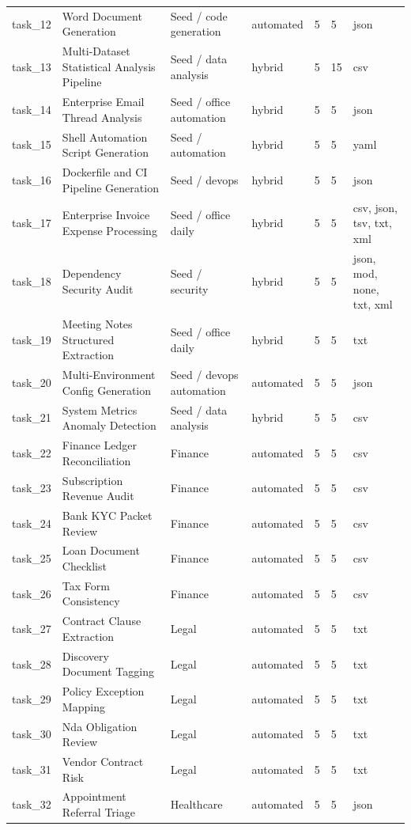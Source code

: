 \documentclass[11pt]{article}
\begin{document}
\begin{longtable}{L{0.09\textwidth}L{0.30\textwidth}L{0.25\textwidth}L{0.10\textwidth}L{0.07\textwidth}L{0.07\textwidth}L{0.08\textwidth}}
task\_12 & Word Document Generation & Seed / code generation & automated & 5 & 5 & json \\
task\_13 & Multi-Dataset Statistical Analysis Pipeline & Seed / data analysis & hybrid & 5 & 15 & csv \\
task\_14 & Enterprise Email Thread Analysis & Seed / office automation & hybrid & 5 & 5 & json \\
task\_15 & Shell Automation Script Generation & Seed / automation & hybrid & 5 & 5 & yaml \\
task\_16 & Dockerfile and CI Pipeline Generation & Seed / devops & hybrid & 5 & 5 & json \\
task\_17 & Enterprise Invoice Expense Processing & Seed / office daily & hybrid & 5 & 5 & csv, json, tsv, txt, xml \\
task\_18 & Dependency Security Audit & Seed / security & hybrid & 5 & 5 & json, mod, none, txt, xml \\
task\_19 & Meeting Notes Structured Extraction & Seed / office daily & hybrid & 5 & 5 & txt \\
task\_20 & Multi-Environment Config Generation & Seed / devops automation & automated & 5 & 5 & json \\
task\_21 & System Metrics Anomaly Detection & Seed / data analysis & hybrid & 5 & 5 & csv \\
task\_22 & Finance Ledger Reconciliation & Finance & automated & 5 & 5 & csv \\
task\_23 & Subscription Revenue Audit & Finance & automated & 5 & 5 & csv \\
task\_24 & Bank KYC Packet Review & Finance & automated & 5 & 5 & csv \\
task\_25 & Loan Document Checklist & Finance & automated & 5 & 5 & csv \\
task\_26 & Tax Form Consistency & Finance & automated & 5 & 5 & csv \\
task\_27 & Contract Clause Extraction & Legal & automated & 5 & 5 & txt \\
task\_28 & Discovery Document Tagging & Legal & automated & 5 & 5 & txt \\
task\_29 & Policy Exception Mapping & Legal & automated & 5 & 5 & txt \\
task\_30 & Nda Obligation Review & Legal & automated & 5 & 5 & txt \\
task\_31 & Vendor Contract Risk & Legal & automated & 5 & 5 & txt \\
task\_32 & Appointment Referral Triage & Healthcare & automated & 5 & 5 & json \\

\end{longtable}
\end{document}
